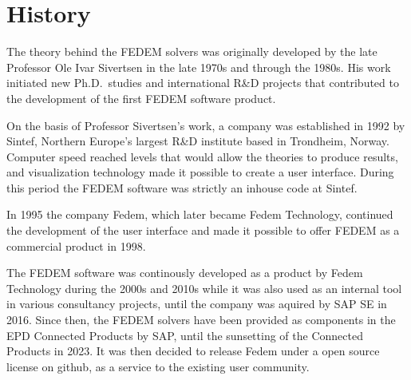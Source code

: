 %
%

%
%

\section{History}

The theory behind the FEDEM solvers was originally developed by
the late Professor Ole Ivar Sivertsen in the late 1970s and through the 1980s.
His work initiated new Ph.D.\ studies and international R\&D projects
that contributed to the development of the first FEDEM software product.

On the basis of Professor Sivertsen's work, a company was established in 1992
by Sintef, Northern Europe's largest R\&D institute based in Trondheim, Norway.
Computer speed reached levels that would allow the theories to produce results,
and visualization technology made it possible to create a user interface.
During this period the FEDEM software was strictly an inhouse code at Sintef.

In 1995 the company Fedem, which later became Fedem Technology,
continued the development of the user interface and made it possible to offer
FEDEM as a commercial product in 1998.

The FEDEM software was continously developed as a product by Fedem Technology
during the 2000s and 2010s while it was also used as an internal tool in
various consultancy projects, until the company was aquired by SAP SE in 2016.
Since then, the FEDEM solvers have been provided as components in the
EPD Connected Products by SAP, until the sunsetting of the Connected Products
in 2023. It was then decided to release Fedem under a open source license
on github, as a service to the existing user community.
